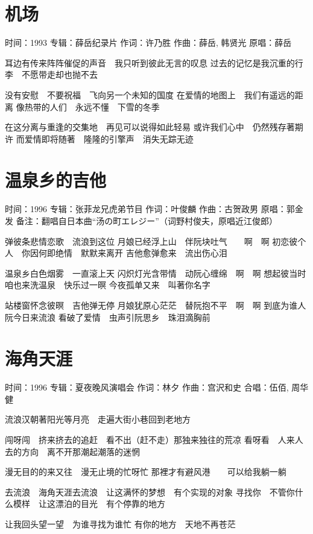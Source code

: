 \documentclass[UTF8,a4paper,oneside,twocolumn,12pt]{ctexbook}
\newcommand{\infopair}[2]{\textbullet #1：#2}
\newcommand{\zc}[1][伍佰]{\infopair{作词}{#1}}
\newcommand{\zq}[1][伍佰]{\infopair{作曲}{#1}}
\newcommand{\zj}[1]{\infopair{专辑}{#1}}
\newcommand{\yc}[1]{\infopair{原唱}{#1}}
\newcommand{\sj}[1]{\infopair{时间}{#1}}
\newcommand{\bz}[1]{\infopair{备注}{#1}}
\newenvironment{info}{\begin{flushleft}\kaishu
	}
	{\end{flushleft}\normalsize\yahei\par}
\newenvironment{lyric}{
	}
{}
\begin{document}
\section{机场}
\begin{info}
	\sj{1993}
	\zj{薛岳纪录片}
	\zc[许乃胜]
	\zq[薛岳, 韩贤光]
	\yc{薛岳}
\end{info}
\begin{lyric}
	耳边有传来阵阵催促的声音　我只听到彼此无言的叹息
	过去的记忆是我沉重的行李　不愿带走却也抛不去

	没有安慰　不要祝福　飞向另一个未知的国度
	在爱情的地图上　我们有遥远的距离
	像热带的人们　永远不懂　下雪的冬季

	在这分离与重逢的交集地　再见可以说得如此轻易
	或许我们心中　仍然残存著期许
	而爱情即将随著　隆隆的引擎声　消失无踪无迹
\end{lyric}

\section{温泉乡的吉他}%
\begin{info}
	\sj{1996}
	\zj{张菲龙兄虎弟节目}
	\zc[叶俊麟]
	\zq[古贺政男]
	\yc{郭金发}
	\bz{翻唱自日本曲“汤の町エレジー”（词野村俊夫，原唱近江俊郎）}
\end{info}
\begin{lyric}
	弹彼条悲情恋歌　流浪到这位
	月娘已经浮上山　伴阮块吐气　　啊　啊
	初恋彼个人　你因何即绝情　默默来离开
	吉他愈弹愈来　流出伤心泪

	温泉乡白色烟雾　一直滚上天
	闪炽灯光含带情　动阮心缠绵　啊　啊
	想起彼当时　咱也来洗温泉　快乐过一暝
	今夜孤单又来　叫著你名字

	站楼窗怀念彼暝　吉他弹无停
	月娘犹原心茫茫　替阮抱不平　啊　啊
	到底为谁人　阮今日来流浪
	看破了爱情　虫声引阮思乡　珠泪滴胸前
\end{lyric}

\section{海角天涯}
\begin{info}
	\sj{1996}
	\zj{夏夜晚风演唱会}
	\zc[林夕]
	\zq[宫沢和史]
	\infopair{合唱}{伍佰, 周华健}
\end{info}
\begin{lyric}
	流浪汉朝著阳光等月亮　走遍大街小巷回到老地方

	闯呀闯　挤来挤去的追赶　看不出（赶不走）那独来独往的荒凉
	看呀看　人来人去的方向　离不开那潮起潮落的迷惘

	漫无目的的来又往　漫无止境的忙呀忙
	那裡才有避风港　　可以给我躺一躺

	去流浪　海角天涯去流浪　让这满怀的梦想　有个实现的对象
	寻找你　不管你什么模样　让这漂泊的目光　有个停靠的地方

	让我回头望一望　为谁寻找为谁忙
	有你的地方　天地不再苍茫
\end{lyric}
\end{document}
